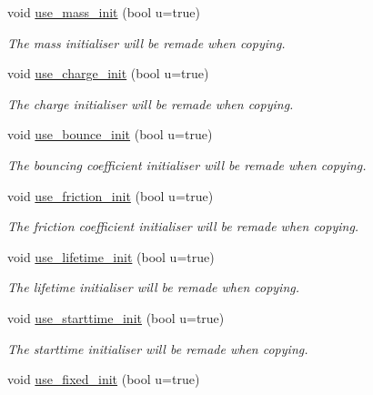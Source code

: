 \begin{DoxyCompactItemize}
void \hyperlink{classphysim_1_1emitters_1_1free__emitters_1_1multisource_a7fb61c1618b2e22f8afd953d065b52b8}{use\+\_\+mass\+\_\+init} (bool u=true)
\begin{DoxyCompactList}\small\item\em The mass initialiser will be remade when copying. \end{DoxyCompactList}\item 
void \hyperlink{classphysim_1_1emitters_1_1free__emitters_1_1multisource_a9def4fac2754546b0130fce7557785b3}{use\+\_\+charge\+\_\+init} (bool u=true)
\begin{DoxyCompactList}\small\item\em The charge initialiser will be remade when copying. \end{DoxyCompactList}\item 
void \hyperlink{classphysim_1_1emitters_1_1free__emitters_1_1multisource_a7953b29add1e27f1b6937ca3191d6f2f}{use\+\_\+bounce\+\_\+init} (bool u=true)
\begin{DoxyCompactList}\small\item\em The bouncing coefficient initialiser will be remade when copying. \end{DoxyCompactList}\item 
void \hyperlink{classphysim_1_1emitters_1_1free__emitters_1_1multisource_adae750ba93adee9a299e9f83735fe79e}{use\+\_\+friction\+\_\+init} (bool u=true)
\begin{DoxyCompactList}\small\item\em The friction coefficient initialiser will be remade when copying. \end{DoxyCompactList}\item 
void \hyperlink{classphysim_1_1emitters_1_1free__emitters_1_1multisource_a1e2a1b53db17d53177706d6d46884a59}{use\+\_\+lifetime\+\_\+init} (bool u=true)
\begin{DoxyCompactList}\small\item\em The lifetime initialiser will be remade when copying. \end{DoxyCompactList}\item 
void \hyperlink{classphysim_1_1emitters_1_1free__emitters_1_1multisource_a89210347706352017c867877bc16fbec}{use\+\_\+starttime\+\_\+init} (bool u=true)
\begin{DoxyCompactList}\small\item\em The starttime initialiser will be remade when copying. \end{DoxyCompactList}\item 
void \hyperlink{classphysim_1_1emitters_1_1free__emitters_1_1multisource_a115436d1054f17688925a6157399f7a9}{use\+\_\+fixed\+\_\+init} (bool u=true)

\end{DoxyCompactItemize}
